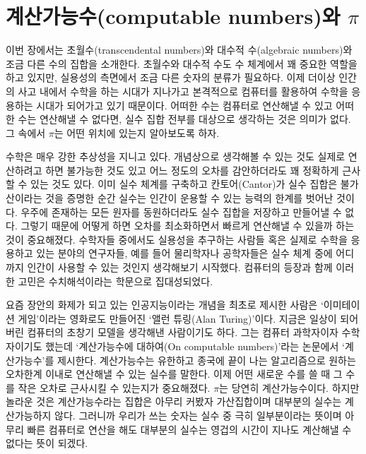 \documentclass[10pt]{article}
\begin{document}
\section{계산가능수(computable numbers)와 $\pi$}
이번 장에서는 초월수(transcendental numbers)와 대수적 수(algebraic numbers)와 조금 다른 수의 집합을 소개한다. 초월수와 대수적 수도 수 체계에서 꽤 중요한 역할을 하고 있지만, 실용성의 측면에서 조금 다른 숫자의 분류가 필요하다. 이제 더이상 인간의 사고 내에서 수학을 하는 시대가 지나가고 본격적으로 컴퓨터를 활용하여 수학을 응용하는 시대가 되어가고 있기 때문이다. 어떠한 수는 컴퓨터로 연산해낼 수 있고 어떠한 수는 연산해낼 수 없다면, 실수 집합 전부를 대상으로 생각하는 것은 의미가 없다. 그 속에서 $\pi$는 어떤 위치에 있는지 알아보도록 하자. \par
수학은 매우 강한 추상성을 지니고 있다. 개념상으로 생각해볼 수 있는 것도 실제로 연산하려고 하면 불가능한 것도 있고 어느 정도의 오차를 감안하더라도 꽤 정확하게 근사할 수 있는 것도 있다. 이미 실수 체계를 구축하고 칸토어(Cantor)가 실수 집합은 불가산이라는 것을 증명한 순간 실수는 인간이 운용할 수 있는 능력의 한계를 벗어난 것이다. 우주에 존재하는 모든 원자를 동원하더라도 실수 집합을 저장하고 만들어낼 수 없다. 그렇기 때문에 어떻게 하면 오차를 최소화하면서 빠르게 연산해낼 수 있을까 하는 것이 중요해졌다. 수학자들 중에서도 실용성을 추구하는 사람들 혹은 실제로 수학을 응용하고 있는 분야의 연구자들, 예를 들어 물리학자나 공학자들은 실수 체계 중에 어디까지 인간이 사용할 수 있는 것인지 생각해보기 시작했다. 컴퓨터의 등장과 함께 이러한 고민은 수치해석이라는 학문으로 집대성되었다. \par
요즘 장안의 화제가 되고 있는 인공지능이라는 개념을 최초로 제시한 사람은 `이미테이션 게임'이라는 영화로도 만들어진 `앨런 튜링(Alan Turing)'이다. 지금은 일상이 되어버린 컴퓨터의 초창기 모델을 생각해낸 사람이기도 하다. 그는 컴퓨터 과학자이자 수학자이기도 했는데 `계산가능수에 대하여(On computable numbers)'라는 논문\cite{oncomputablenumbers}에서 `계산가능수'를 제시한다. 계산가능수는 유한하고 종국에 끝이 나는 알고리즘으로 원하는 오차한계 이내로 연산해낼 수 있는 실수를 말한다. 이제 어떤 새로운 수를 쓸 때 그 수를 작은 오차로 근사시킬 수 있는지가 중요해졌다. $\pi$는 당연히 계산가능수이다. 하지만 놀라운 것은 계산가능수라는 집합은 아무리 커봤자 가산집합이며 대부분의 실수는 계산가능하지 않다. 그러니까 우리가 쓰는 숫자는 실수 중 극히 일부분이라는 뜻이며 아무리 빠른 컴퓨터로 연산을 해도 대부분의 실수는 영겁의 시간이 지나도 계산해낼 수 없다는 뜻이 되겠다.
\end{document}
